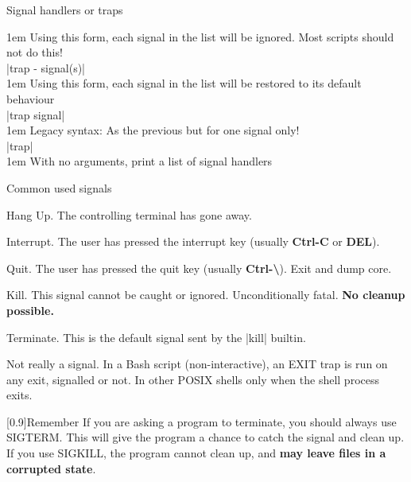 \begin{frame}{Signal handlers or traps}
\begin{onlyenv}
        \begingroup\leftskip1em
            Using this form, each signal in the list will be ignored. \alert{Most scripts should not do this!}\\[0.4em]
        \endgroup
        \colorbox{background-color}{\bash|trap - signal(s)|}\\[0.3em]
        \begingroup\leftskip1em
            Using this form, each signal in the list will be restored to its default behaviour\\[0.4em]
        \endgroup
        \colorbox{background-color}{\bash|trap signal|}\\[0.3em]
        \begingroup\leftskip1em
            Legacy syntax: As the previous but for one signal only!\\[0.4em]
        \endgroup
        \colorbox{background-color}{\bash|trap|}\\[0.3em]
        \begingroup\leftskip1em
            With no arguments, print a list of signal handlers\\
        \endgroup
    \end{onlyenv}
\end{frame}
\begin{frame}{Common used signals}
    \begin{description}[TERMX]
        \item[\textbf{HUP}] Hang Up. The controlling terminal has gone away.
        \item[\textbf{INT}] Interrupt. The user has pressed the interrupt key (usually \textbf{Ctrl-C} or \textbf{DEL}).
        \item[\textbf{QUIT}] Quit. The user has pressed the quit key (usually \textbf{Ctrl-\textbackslash}). Exit and dump core.
        \item[\textbf{KILL}] Kill. \alert{This signal cannot be caught or ignored.} Unconditionally fatal. \textbf{\textbf{No cleanup possible.}}
        \item[\textbf{TERM}] Terminate. This is the default signal sent by the \bash|kill| builtin.
        \item[\textbf{EXIT}] Not really a signal. In a Bash script (non-interactive), an EXIT trap is run on any exit, signalled or not. In other POSIX shells only when the shell process exits.
    \end{description}
    \begin{varblock}{}[0.9\textwidth]{Remember}
        If you are asking a program to terminate, you should always use SIGTERM. %
        This will give the program a chance to catch the signal and clean up.
        If you use SIGKILL, the program cannot clean up, and \textbf{may leave files in a corrupted state}.
    \end{varblock}
\end{frame}

